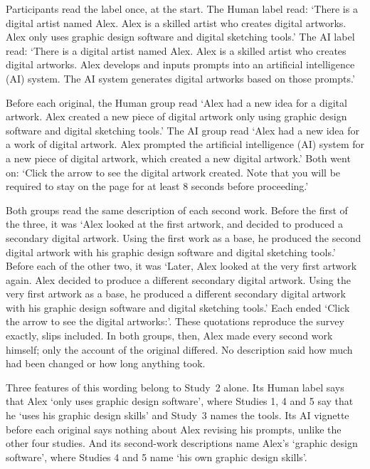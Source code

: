 Participants read the label once, at the start. The Human label read: `There is a digital artist named Alex. Alex is a skilled artist who creates digital artworks. Alex only uses graphic design software and digital sketching tools.' The AI label read: `There is a digital artist named Alex. Alex is a skilled artist who creates digital artworks. Alex develops and inputs prompts into an artificial intelligence (AI) system. The AI system generates digital artworks based on those prompts.'

Before each original, the Human group read `Alex had a new idea for a digital artwork. Alex created a new piece of digital artwork only using graphic design software and digital sketching tools.' The AI group read `Alex had a new idea for a work of digital artwork. Alex prompted the artificial intelligence (AI) system for a new piece of digital artwork, which created a new digital artwork.' Both went on: `Click the arrow to see the digital artwork created. Note that you will be required to stay on the page for at least 8 seconds before proceeding.'

Both groups read the same description of each second work. Before the first of the three, it was `Alex looked at the first artwork, and decided to produced a secondary digital artwork. Using the first work as a base, he produced the second digital artwork with his graphic design software and digital sketching tools.' Before each of the other two, it was `Later, Alex looked at the very first artwork again. Alex decided to produce a different secondary digital artwork. Using the very first artwork as a base, he produced a different secondary digital artwork with his graphic design software and digital sketching tools.' Each ended `Click the arrow to see the digital artworks:'. These quotations reproduce the survey exactly, slips included. In both groups, then, Alex made every second work himself; only the account of the original differed. No description said how much had been changed or how long anything took.

Three features of this wording belong to Study~2 alone. Its Human label says that Alex `only uses graphic design software', where Studies 1, 4 and 5 say that he `uses his graphic design skills' and Study~3 names the tools. Its AI vignette before each original says nothing about Alex revising his prompts, unlike the other four studies. And its second-work descriptions name Alex's `graphic design software', where Studies 4 and 5 name `his own graphic design skills'.

